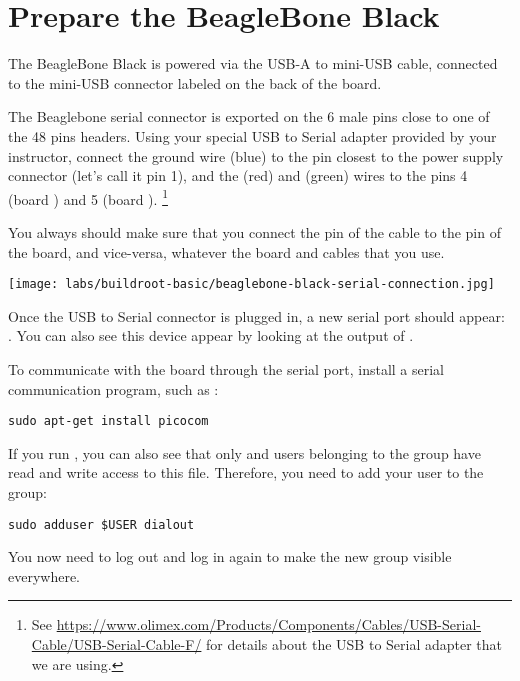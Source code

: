 \section{Prepare the BeagleBone Black}

The BeagleBone Black is powered via the USB-A to mini-USB cable,
connected to the mini-USB connector labeled  on the back of
the board.

The Beaglebone serial connector is exported on the 6 male pins close
to one of the 48 pins headers. Using your special USB to Serial
adapter provided by your instructor, connect the ground wire (blue) to
the pin closest to the power supply connector (let's call it pin 1),
and the  (red) and  (green) wires to the pins 4
(board ) and 5 (board ). \footnote{See
  \url{https://www.olimex.com/Products/Components/Cables/USB-Serial-Cable/USB-Serial-Cable-F/}
  for details about the USB to Serial adapter that we are using.}

You always should make sure that you connect the  pin of the
cable to the  pin of the board, and vice-versa, whatever the
board and cables that you use.

\begin{center}
\texttt{[image: labs/buildroot-basic/beaglebone-black-serial-connection.jpg]}
\end{center}

Once the USB to Serial connector is plugged in, a new serial port
should appear: .  You can also see this device
appear by looking at the output of .

To communicate with the board through the serial port, install a
serial communication program, such as :

\begin{verbatim}
sudo apt-get install picocom
\end{verbatim}

If you run , you can also see that only
 and users belonging to the  group have read
and write access to this file. Therefore, you need to add your user to
the  group:

\begin{verbatim}
sudo adduser $USER dialout
\end{verbatim}

You now need to log out and log in again to make the new group visible
everywhere.

